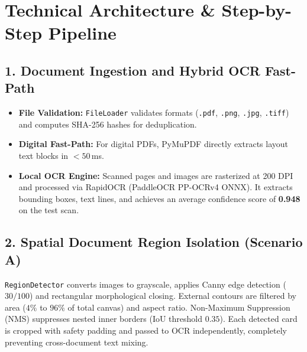 \documentclass[11pt,a4paper]{article}
\begin{document}
\section{Technical Architecture \& Step-by-Step Pipeline}

\subsection{1. Document Ingestion and Hybrid OCR Fast-Path}
\begin{itemize}[leftmargin=*, noitemsep]
    \item \textbf{File Validation:} \texttt{FileLoader} validates formats (\texttt{.pdf}, \texttt{.png}, \texttt{.jpg}, \texttt{.tiff}) and computes SHA-256 hashes for deduplication.
    \item \textbf{Digital Fast-Path:} For digital PDFs, PyMuPDF directly extracts layout text blocks in $< 50\,$ms.
    \item \textbf{Local OCR Engine:} Scanned pages and images are rasterized at 200 DPI and processed via RapidOCR (PaddleOCR PP-OCRv4 ONNX). It extracts bounding boxes, text lines, and achieves an average confidence score of \textbf{0.948} on the test scan.
\end{itemize}

\subsection{2. Spatial Document Region Isolation (Scenario A)}
\texttt{RegionDetector} converts images to grayscale, applies Canny edge detection ($30/100$) and rectangular morphological closing. External contours are filtered by area ($4\%$ to $96\%$ of total canvas) and aspect ratio. Non-Maximum Suppression (NMS) suppresses nested inner borders (IoU threshold $0.35$). Each detected card is cropped with safety padding and passed to OCR independently, completely preventing cross-document text mixing.
\end{document}
